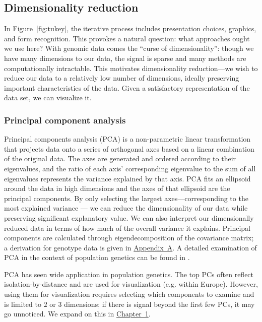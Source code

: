 \subsection{Dimensionality reduction}

In Figure~\ref{fig:tukey}, the iterative process includes presentation choices, graphics, and form recognition. This provokes a natural question: what approaches ought we use here? With genomic data comes the ``curse of dimensionality'': though we have many dimensions to our data, the signal is sparse and many methods are computationally intractable. This motivates dimensionality reduction---we wish to reduce our data to a relatively low number of dimensions, ideally preserving important characteristics of the data. Given a satisfactory representation of the data set, we can visualize it.

\subsubsection{Principal component analysis}
Principal components analysis (PCA) is a non-parametric linear transformation that projects data onto a series of orthogonal axes based on a linear combination of the original data. The axes are generated and ordered according to their eigenvalues, and the ratio of each axis' corresponding eigenvalue to the sum of all eigenvalues represents the variance explained by that axis. PCA fits an ellipsoid around the data in high dimensions and the axes of that ellipsoid are the principal components. By only selecting the largest axes---corresponding to the most explained variance --- we can reduce the dimensionality of our data while preserving significant explanatory value. We can also interpret our dimensionally reduced data in terms of how much of the overall variance it explains. Principal components are calculated through eigendecomposition of the covariance matrix; a derivation for genotype data is given in \hyperref[appendix:AppendixA]{Appendix~A}. A detailed examination of PCA in the context of population genetics can be found in \citep{mcvean_genealogical_2009}. 

PCA has seen wide application in population genetics. The top PCs often reflect isolation-by-distance and are used for visualization (e.g. within Europe\citep{novembre2008europe}). However, using them for visualization requires selecting which components to examine and is limited to $2$ or $3$ dimensions; if there is signal beyond the first few PCs, it may go unnoticed. We expand on this in \hyperref[chap:chapter1]{Chapter~1}.

